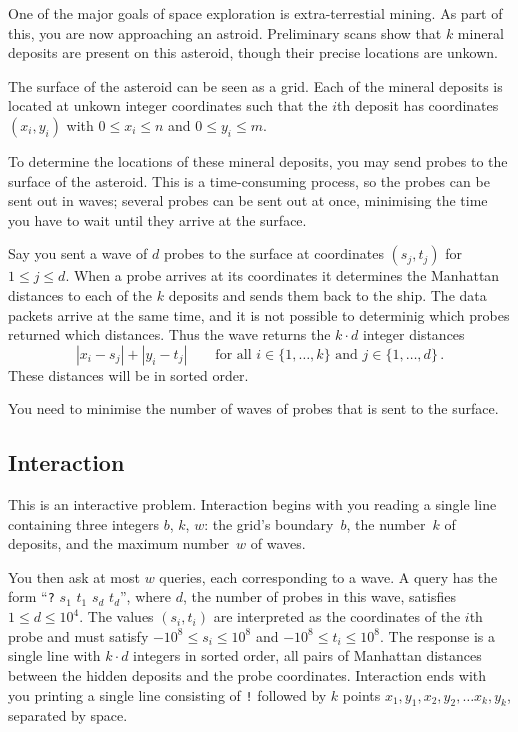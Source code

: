 
One of the major goals of space exploration is extra-terrestial mining. 
As part of this, you are now approaching an astroid. 
Preliminary scans show that $k$ mineral deposits are present on this asteroid, though their precise locations are unkown.

\medskip

The surface of the asteroid can be seen as a grid.
Each of the mineral deposits is located at unkown integer coordinates such that the $i$th deposit has coordinates $(x_i,y_i)$ with  $0 \le x_i \le n$ and $0\le y_i \le m$.

To determine the locations of these mineral deposits, you may send probes to the surface of the asteroid. 
This is a time-consuming process, so the probes can be sent out in waves;
several probes can be sent out at once, minimising the time you have to wait until they arrive at the surface.

Say you sent a wave of $d$ probes to the surface at coordinates $(s_j,t_j)$ for $1\leq j\leq d$.
When a probe arrives at its coordinates it determines the Manhattan distances to each of the $k$ deposits and sends them back to the ship. 
The data packets arrive at the same time, and it is not possible to determinig which probes returned which distances. 
Thus the wave returns the $k\cdot d$ integer distances
\[|x_i-s_j| + |y_i - t_j| \qquad\text{for all } i \in \{1,\ldots,k\} \text{ and } j \in\{ 1,\ldots,d\}\,.\]
These distances will be in sorted order.

You need to minimise the number of waves of probes that is sent to the surface.

\subsection*{Interaction}

This is an interactive problem.
Interaction begins with you reading a single line containing three integers $b$, $k$, $w$:
the grid's boundary~$b$,
the number~$k$ of deposits,
and the maximum number~$w$ of waves.

You then ask at most $w$ queries, each corresponding to a wave.
A query has the form ``\texttt{?} $s_1$ $t_1$ \cdots $s_d$ $t_d$'', where $d$, the number of probes in this wave, satisfies
$1\leq d\leq 10^4$. %
The values $(s_i,t_i)$ are interpreted as the coordinates of the $i$th probe and must satisfy
$-10^8 \leq s_i \leq 10^8$ and $-10^8 \leq t_i \leq 10^8$. %
The response is a single line with $k \cdot d$ integers in sorted order, all pairs of Manhattan distances between the hidden deposits and the probe coordinates.
Interaction ends with you printing a single line consisting of \texttt{!} followed by $k$ points $x_1, y_1, x_2, y_2, \ldots x_k, y_k$, separated by space.

